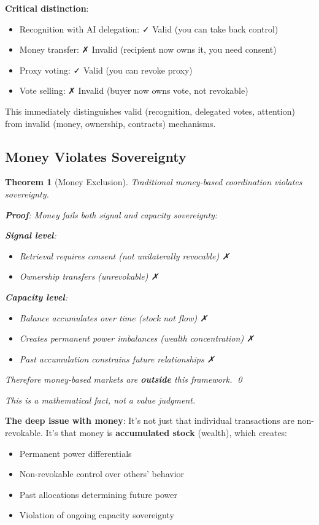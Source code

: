 \documentclass[11pt,a4paper]{article}
\newtheorem{theorem}{Theorem}[section]
\theoremstyle{definition}
\theoremstyle{remark}
\begin{document}
\textbf{Critical distinction}:
\begin{itemize}
\item Recognition with AI delegation: ✓ Valid (you can take back control)
\item Money transfer: ✗ Invalid (recipient now owns it, you need consent)
\item Proxy voting: ✓ Valid (you can revoke proxy)
\item Vote selling: ✗ Invalid (buyer now owns vote, not revokable)
\end{itemize}

This immediately distinguishes valid (recognition, delegated votes, attention) from invalid (money, ownership, contracts) mechanisms.

\subsection{Money Violates Sovereignty}

\begin{theorem}[Money Exclusion]
Traditional money-based coordination violates sovereignty.

\textbf{Proof}: Money fails both signal and capacity sovereignty:

\textbf{Signal level}:
\begin{itemize}
\item Retrieval requires consent (not unilaterally revocable) ✗
\item Ownership transfers (unrevokable) ✗
\end{itemize}

\textbf{Capacity level}:
\begin{itemize}
\item Balance accumulates over time (stock not flow) ✗
\item Creates permanent power imbalances (wealth concentration) ✗
\item Past accumulation constrains future relationships ✗
\end{itemize}

Therefore money-based markets are \textbf{outside} this framework. \qed
\end{theorem}

\textit{This is a mathematical fact, not a value judgment.}

\textbf{The deep issue with money}: It's not just that individual transactions are non-revokable. It's that money is \textbf{accumulated stock} (wealth), which creates:
\begin{itemize}
\item Permanent power differentials
\item Non-revokable control over others' behavior
\item Past allocations determining future power
\item Violation of ongoing capacity sovereignty
\end{itemize}
\end{document}
